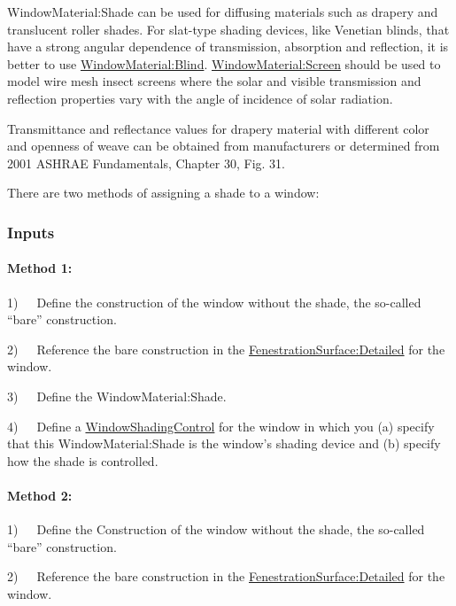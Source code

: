 WindowMaterial:Shade can be used for diffusing materials such as drapery and translucent roller shades. For slat-type shading devices, like Venetian blinds, that have a strong angular dependence of transmission, absorption and reflection, it is better to use \hyperref[windowmaterialblind]{WindowMaterial:Blind}. \hyperref[windowmaterialscreen]{WindowMaterial:Screen} should be used to model wire mesh insect screens where the solar and visible transmission and reflection properties vary with the angle of incidence of solar radiation.

Transmittance and reflectance values for drapery material with different color and openness of weave can be obtained from manufacturers or determined from 2001 ASHRAE Fundamentals, Chapter 30, Fig. 31.

There are two methods of assigning a shade to a window:

\subsubsection{Inputs}\label{inputs-22-005}

\paragraph{Method 1:}\label{method-1}

1)~~~Define the construction of the window without the shade, the so-called ``bare'' construction.

2)~~~Reference the bare construction in the \hyperref[fenestrationsurfacedetailed]{FenestrationSurface:Detailed} for the window.

3)~~~Define the WindowMaterial:Shade.

4)~~~Define a \hyperref[windowpropertyshadingcontrol]{WindowShadingControl} for the window in which you (a) specify that this WindowMaterial:Shade is the window's shading device and (b) specify how the shade is controlled.

\paragraph{Method 2:}\label{method-2}

1)~~~Define the Construction of the window without the shade, the so-called ``bare'' construction.

2)~~~Reference the bare construction in the \hyperref[fenestrationsurfacedetailed]{FenestrationSurface:Detailed} for the window.

